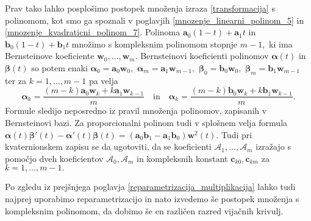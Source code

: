 \documentclass[12pt,a4paper,twoside]{article}
\theoremstyle{definition} %
\theoremstyle{plain} %
\numberwithin{equation}{section}  %
\newcommand{\aV}{\mathbf{a}}
\newcommand{\bV}{\mathbf{b}}
\newcommand{\cV}{\mathbf{c}}
\newcommand{\wV}{\mathbf{w}}
\newcommand{\AQ}{\mathcal{A}}
\newcommand{\balpha}{\boldsymbol \alpha}
\newcommand{\bbeta}{\boldsymbol \beta}
\begin{document}
Prav tako lahko posplošimo postopek množenja izraza \eqref{transformacija} s polinomom, kot smo ga spoznali v poglavjih \ref{mnozenje_linearni_polinom_5} in \ref{mnozenje_kvadraticni_polinom_7}. Polinoma $\aV_0(1-t)+\aV_1t$ in $\bV_0(1-t)+\bV_1t$ množimo s kompleksnim polinomom stopnje $m-1,$ ki ima Bernsteinove koeficiente $\wV_0,\dots,\wV_m.$ Bernsteinovi koeficienti polinomov $\balpha(t)$ in $\bbeta(t)$ so potem enaki $\balpha_0=\aV_0\wV_0,$ $\balpha_m=\aV_1\wV_{m-1},$ $\bbeta_0=\bV_0\wV_0,$ $\bbeta_m=\bV_1\wV_{m-1}$ ter za $k=1,\dots,m-1$ pa velja
\begin{equation*}
	\balpha_k=\frac{(m-k)\aV_0\wV_k+k\aV_1\wV_{k-1}}{m}\quad\text{in}\quad\balpha_k=\frac{(m-k)\bV_0\wV_k+k\bV_1\wV_{k-1}}{m}.
\end{equation*}
Formule sledijo neposredno iz pravil množenja polinomov, zapisanih v Bernsteinovi bazi. Za proporcionalni polinom tudi v splošnem velja formula $\balpha(t)\bbeta'(t)-\balpha'(t)\bbeta(t)=(\aV_0\bV_1-\aV_1\bV_0)\wV^2(t).$ Tudi pri kvaternionskem zapisu se da ugotoviti, da se koeficienti $\AQ_1,\dots,\AQ_m$ izražajo s pomočjo dveh koeficientov $\AQ_0,\AQ_m$ in kompleksnih konstant $\cV_{k0},\cV_{km}$ za $k=1,\dots,m-1.$

Po zgledu iz prejšnjega poglavja \ref{reparametrizacija_multiplikacija} lahko tudi najprej uporabimo reparametrizacijo in nato izvedemo še postopek množenja s kompleksnim polinomom, da dobimo še en različen razred vijačnih krivulj.




\end{document}
